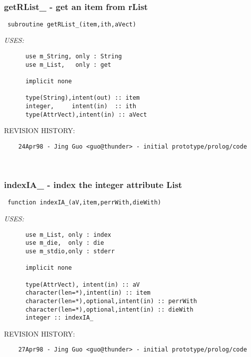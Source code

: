 
\mbox{}\hrulefill\ 
 

 \subsubsection{getRList\_ - get an item from rList}


 
 
\begin{verbatim} 
 subroutine getRList_(item,ith,aVect)\end{verbatim}{\em USES:}
\begin{verbatim}      use m_String, only : String
      use m_List,   only : get
 
      implicit none
 
      type(String),intent(out) :: item
      integer,     intent(in)  :: ith
      type(AttrVect),intent(in) :: aVect
 \end{verbatim}{\sf REVISION HISTORY:}
\begin{verbatim}  	24Apr98 - Jing Guo <guo@thunder> - initial prototype/prolog/code\end{verbatim}
 
 
\mbox{}\hrulefill\ 
 

 \subsubsection{indexIA\_ - index the integer attribute List}


 
 
\begin{verbatim} 
 function indexIA_(aV,item,perrWith,dieWith)\end{verbatim}{\em USES:}
\begin{verbatim}      use m_List, only : index
      use m_die,  only : die
      use m_stdio,only : stderr
 
      implicit none
 
      type(AttrVect), intent(in) :: aV
      character(len=*),intent(in) :: item
      character(len=*),optional,intent(in) :: perrWith
      character(len=*),optional,intent(in) :: dieWith
      integer :: indexIA_
 \end{verbatim}{\sf REVISION HISTORY:}
\begin{verbatim}  	27Apr98 - Jing Guo <guo@thunder> - initial prototype/prolog/code\end{verbatim}
 
